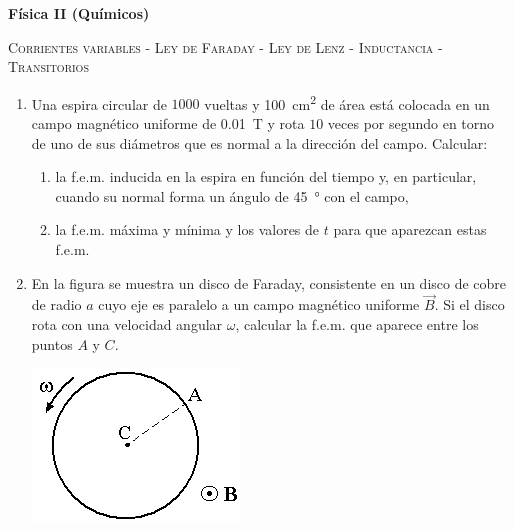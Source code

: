 \documentclass[11pt,spanish,a4paper]{article}
\begin{document}
\noindent
\textbf{Física II (Químicos)}\hfill {}
\begin{center}
  \textsc{\large Corrientes variables - Ley de Faraday - Ley de Lenz - Inductancia - Transitorios} 
\par\end{center}{\large \par}


\begin{enumerate}

\section*{Corrientes variables - Ley de Faraday - Ley de Lenz}
	\item Una espira circular de \(1000\) vueltas y \SI{100}{\centi\metre\squared} de área está colocada en un campo magnético uniforme de \SI{0.01}{T} y rota \(10\) veces por segundo en torno de uno de sus diámetros que es normal a la dirección del campo. Calcular:
	\begin{enumerate}
		\item la f.e.m. inducida en la espira en función del tiempo y, en particular, cuando su normal forma un ángulo de \SI{45}{\degree} con el campo, 
		\item la f.e.m. máxima y mínima y los valores de \(t\) para que aparezcan estas f.e.m.
	\end{enumerate}


	\item \begin{minipage}[t][3.5cm]{0.7\textwidth}
		En la figura se muestra un disco de Faraday, consistente en un disco de cobre de radio \(a\) cuyo eje es paralelo a un campo magnético uniforme \(\vec{B}\).
		Si el disco rota con una velocidad angular \(\omega \), calcular la f.e.m. que aparece entre los puntos \(A\) y \(C\).
    \end{minipage}
    \begin{minipage}[c][1em][t]{0.25\textwidth}
		\includegraphics[width=\textwidth]{p5e02}
    \end{minipage}



\end{enumerate}
\end{document}
